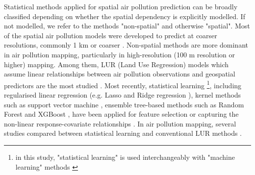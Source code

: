 \documentclass{article}
\begin{document}

Statistical methods applied for spatial air pollution prediction can be broadly classified depending on whether the spatial dependency is explicitly modelled. If not modelled, we refer to the methods "non-spatial" and otherwise "spatial". Most of the spatial air pollution models were developed to predict at coarser resolutions, commonly 1 km or coarser \citep{young2016satellite,shaddick2018data,BELOCONI2020105578}. Non-spatial methods are more dominant in air pollution mapping, particularly in high-resolution (100 m resolution or higher) mapping. Among them, LUR (Land Use Regression) models which assume linear relationships between air pollution observations and geospatial predictors are the most studied \citep{briggs2000regression,hoek2008review}. Most recently, statistical learning \footnote{in this study, "statistical learning" is used interchangeably with "machine learning" methods \citep{hastie2009elements}}, including regularised linear regression (e.g. Lasso and Ridge regression \citep{James2013introduction}), kernel methods such as support vector machine \citep{svm1999least}, ensemble tree-based methods such as Random Forest \citep[RF,][]{breiman2001random} and XGBoost \citep[XGB,][]{chen2016xgboost}, have been applied for feature selection or capturing the non-linear response-covariate relationships \citep{luglobal,chen2019comparison}. In air pollution mapping, several studies compared between statistical learning and conventional LUR methods  \citep{chen2019comparison,kerckhoffs2019performance,luglobal,REN2020105827,machinereview}.
\end{document}
